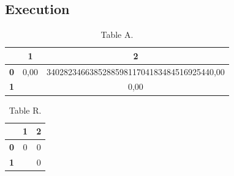 \documentclass{article}
\begin{document}
\subsection{Execution}
\begin{table}[!ht]
\begin{adjustwidth}{-3cm}{-3cm}
\centering
\begin{tabular}{c||c|c|}
\cline{2-3}
 & \cellcolor{gray90}\textbf{1} & \cellcolor{gray90}\textbf{2} \\
\hline\hline
\multicolumn{1}{|c||}{\cellcolor{gray90}\textbf{0}} & 0,00 & 340282346638528859811704183484516925440,00 \\ \hline
\multicolumn{1}{|c||}{\cellcolor{gray90}\textbf{1}} &  & 0,00 \\ \hline
\end{tabular}
\caption{Table A.}
\end{adjustwidth}
\end{table}

\begin{table}[!ht]
\begin{adjustwidth}{-3cm}{-3cm}
\centering
\begin{tabular}{c||c|c|}
\cline{2-3}
 & \cellcolor{gray90}\textbf{1} & \cellcolor{gray90}\textbf{2} \\
\hline\hline
\multicolumn{1}{|c||}{\cellcolor{gray90}\textbf{0}} & 0 & 0 \\ \hline
\multicolumn{1}{|c||}{\cellcolor{gray90}\textbf{1}} &  & 0 \\ \hline
\end{tabular}
\caption{Table R.}
\end{adjustwidth}
\end{table}
\end{document}
